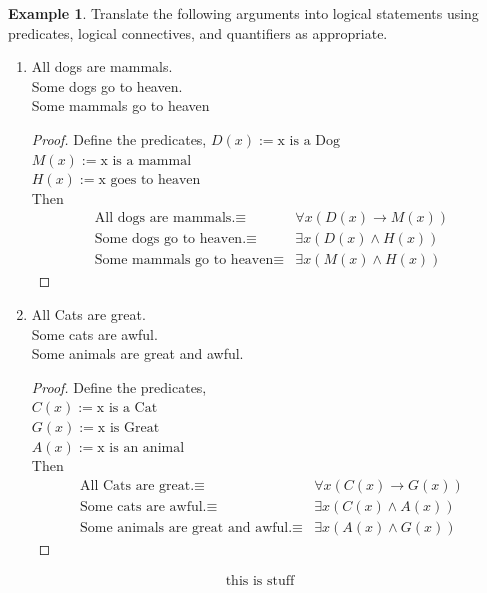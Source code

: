 \documentclass[letterpaper,10pt]{article}
\theoremstyle{plain}
\theoremstyle{definition}
\newtheorem{exmp}[thm]{Example}
\theoremstyle{remark}
\providecommand{\land}{\ensuremath{\wedge}}
\begin{document}
\begin{exmp}
Translate the following arguments into logical statements using predicates, logical connectives, and quantifiers as appropriate.

  \begin{enumerate}
      \item
    All dogs are mammals.\\
    Some dogs go to heaven.\\
    Some mammals go to heaven
\vspace{3cm}
\begin{proof}
Define the predicates,
$D(x):=\text{x is a Dog}$\\
$M(x):=\text{x is a mammal}$\\
$H(x):=\text{x goes to heaven}$\\
Then
\begin{align}
\text{All dogs are mammals.}\equiv& \forall x (D(x)\to M(x))\\
\text{Some dogs go to heaven.}\equiv& \exists x (D(x)\land H(x))\\
\text{Some mammals go to heaven}\equiv& \exists x(M(x) \land H(x))
\end{align}


\end{proof}

  \item
    All Cats are great.\\
    Some cats are awful.\\
    Some animals are great and awful.
    \vspace{3cm}
    \begin{proof}
Define the predicates,\hspace*{\fill} \\ 
$C(x):=\text{x is a Cat}$ \hspace*{\fill} \\ 
$G(x):=\text{x is Great}$\hspace*{\fill} \\ 
$A(x):=\text{x is an animal}$\hspace*{\fill} \\ 

Then
\begin{align}
\text{All Cats are great.}\equiv& \forall x (C(x)\to G(x))\\
\text{Some cats are awful.}\equiv& \exists x (C(x)\land A(x))\\
\text{Some animals are great and awful.}\equiv& \exists x (A(x) \land G(x))
\end{align}


\end{proof}
    
  \end{enumerate}
\begin{align}
\text{this is stuff}
\end{align}
\end{exmp}
\end{document}
